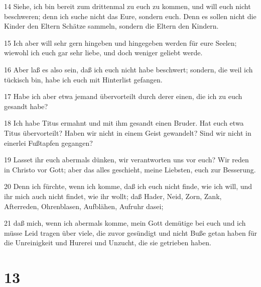 \par 14 Siehe, ich bin bereit zum drittenmal zu euch zu kommen, und will euch nicht beschweren; denn ich suche nicht das Eure, sondern euch. Denn es sollen nicht die Kinder den Eltern Schätze sammeln, sondern die Eltern den Kindern.
\par 15 Ich aber will sehr gern hingeben und hingegeben werden für eure Seelen; wiewohl ich euch gar sehr liebe, und doch weniger geliebt werde.
\par 16 Aber laß es also sein, daß ich euch nicht habe beschwert; sondern, die weil ich tückisch bin, habe ich euch mit Hinterlist gefangen.
\par 17 Habe ich aber etwa jemand übervorteilt durch derer einen, die ich zu euch gesandt habe?
\par 18 Ich habe Titus ermahnt und mit ihm gesandt einen Bruder. Hat euch etwa Titus übervorteilt? Haben wir nicht in einem Geist gewandelt? Sind wir nicht in einerlei Fußtapfen gegangen?
\par 19 Lasset ihr euch abermals dünken, wir verantworten uns vor euch? Wir reden in Christo vor Gott; aber das alles geschieht, meine Liebsten, euch zur Besserung.
\par 20 Denn ich fürchte, wenn ich komme, daß ich euch nicht finde, wie ich will, und ihr mich auch nicht findet, wie ihr wollt; daß Hader, Neid, Zorn, Zank, Afterreden, Ohrenblasen, Aufblähen, Aufruhr dasei;
\par 21 daß mich, wenn ich abermals komme, mein Gott demütige bei euch und ich müsse Leid tragen über viele, die zuvor gesündigt und nicht Buße getan haben für die Unreinigkeit und Hurerei und Unzucht, die sie getrieben haben.

\chapter{13}

